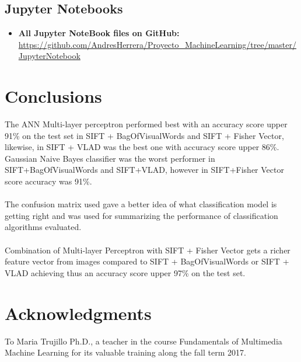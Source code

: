 \documentclass[12pt]{article}
\numberwithin{equation}{section}
\numberwithin{table}{section}
\numberwithin{figure}{section}
\begin{document}
\subsection{Jupyter Notebooks}
\begin{itemize}
	\item {\textbf{All Jupyter NoteBook files on GitHub:} } \url{https://github.com/AndresHerrera/Proyecto_MachineLearning/tree/master/JupyterNotebook} 
\end{itemize}

	
	
\section{Conclusions}

The ANN Multi-layer perceptron performed best with an accuracy score upper 91\% on the test set in SIFT + BagOfVisualWords and SIFT + Fisher Vector, likewise, in SIFT + VLAD  was the best one with accuracy score upper 86\%. Gaussian Naive Bayes classifier was the worst performer in SIFT+BagOfVisualWords  and SIFT+VLAD, however in SIFT+Fisher Vector score accuracy was 91\%.\\\\
\noindent
The confusion matrix used gave a better idea of what classification model is getting right and was used for summarizing the performance of classification algorithms evaluated. \\\\
\noindent
Combination of Multi-layer Perceptron with SIFT + Fisher Vector gets a richer feature vector from images compared to SIFT + BagOfVisualWords  or  SIFT + VLAD achieving thus an accuracy score upper 97\% on the test set.



\section*{Acknowledgments}

To Maria Trujillo Ph.D., a teacher in the course Fundamentals of Multimedia Machine Learning for its valuable training along the fall term 2017.
 



\end{document}
